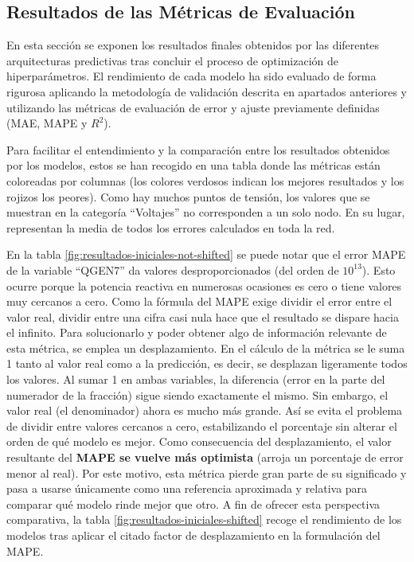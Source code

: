 









\clearpage

\subsection{Resultados de las Métricas de Evaluación}
En esta sección se exponen los resultados finales obtenidos por las diferentes arquitecturas predictivas tras concluir el proceso de optimización de hiperparámetros. El rendimiento de cada modelo ha sido evaluado de forma rigurosa aplicando la metodología de validación descrita en apartados anteriores y utilizando las métricas de evaluación de error y ajuste previamente definidas (MAE, MAPE y $R^2$).

Para facilitar el entendimiento y la comparación entre los resultados obtenidos por los modelos, estos se han recogido en una tabla donde las métricas están coloreadas por columnas (los colores verdosos indican los mejores resultados y los rojizos los peores). Como hay muchos puntos de tensión, los valores que se muestran en la categoría ``Voltajes'' no corresponden a un solo nodo. En su lugar, representan la media de todos los errores calculados en toda la red.

En la tabla \ref{fig:resultados-iniciales-not-shifted} se puede notar que el error MAPE de la variable ``QGEN7'' da valores desproporcionados (del orden de $10^{13}$). Esto ocurre porque la potencia reactiva en numerosas ocasiones es cero o tiene valores muy cercanos a cero. Como la fórmula del MAPE exige dividir el error entre el valor real, dividir entre una cifra casi nula hace que el resultado se dispare hacia el infinito. Para solucionarlo y poder obtener algo de información relevante de esta métrica, se emplea un desplazamiento. En el cálculo de la métrica se le suma 1 tanto al valor real como a la predicción, es decir, se desplazan ligeramente todos los valores. Al sumar 1 en ambas variables, la diferencia (error en la parte del numerador de la fracción) sigue siendo exactamente el mismo. Sin embargo, el valor real (el denominador) ahora es mucho más grande. Así se evita el problema de dividir entre valores cercanos a cero, estabilizando el porcentaje sin alterar el orden de qué modelo es mejor. Como consecuencia del desplazamiento, el valor resultante del \textbf{MAPE se vuelve más optimista} (arroja un porcentaje de error menor al real). Por este motivo, esta métrica pierde gran parte de su significado y pasa a usarse únicamente como una referencia aproximada y relativa para comparar qué modelo rinde mejor que otro. A fin de ofrecer esta perspectiva comparativa, la tabla \ref{fig:resultados-iniciales-shifted} recoge el rendimiento de los modelos tras aplicar el citado factor de desplazamiento en la formulación del MAPE.

